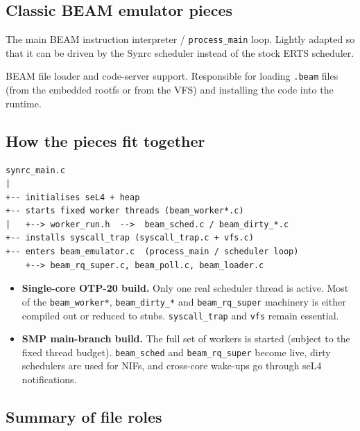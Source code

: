 \documentclass{article}
\begin{document}
\subsection{Classic BEAM emulator pieces}

\begin{description}[style=nextline]
  \item[\texttt{beam\_emulator.h} / \texttt{beam\_emulator.c}]
    The main BEAM instruction interpreter / \texttt{process\_main} loop.
    Lightly adapted so that it can be driven by the Synrc scheduler instead of the stock ERTS scheduler.

  \item[\texttt{beam\_loader.h} / \texttt{beam\_loader.c}]
    BEAM file loader and code-server support.
    Responsible for loading \texttt{.beam} files (from the embedded rootfs or from the VFS) and installing the code into the runtime.
\end{description}

\subsection{How the pieces fit together}

\begin{verbatim}
synrc_main.c
|
+-- initialises seL4 + heap
+-- starts fixed worker threads (beam_worker*.c)
|   +--> worker_run.h  -->  beam_sched.c / beam_dirty_*.c
+-- installs syscall_trap (syscall_trap.c + vfs.c)
+-- enters beam_emulator.c  (process_main / scheduler loop)
    +--> beam_rq_super.c, beam_poll.c, beam_loader.c
\end{verbatim}

\begin{itemize}
  \item \textbf{Single-core OTP-20 build.}
    Only one real scheduler thread is active.
    Most of the \texttt{beam\_worker*}, \texttt{beam\_dirty\_*} and \texttt{beam\_rq\_super} machinery is either compiled out or reduced to stubs.
    \texttt{syscall\_trap} and \texttt{vfs} remain essential.

  \item \textbf{SMP main-branch build.}
    The full set of workers is started (subject to the fixed thread budget).
    \texttt{beam\_sched} and \texttt{beam\_rq\_super} become live, dirty schedulers are used for NIFs, and cross-core wake-ups go through seL4 notifications.
\end{itemize}

\subsection{Summary of file roles}
\end{document}
